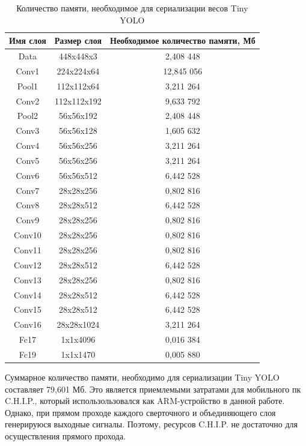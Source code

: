 \documentclass[a4paper,english,russian]{G2-105}
\begin{document}
\begin{longtable}{|c|c|c|}
    \caption{Количество памяти, необходимое для сериализации весов Tiny YOLO} \label{mbtable} \\ \hline
    Имя слоя        & Размер слоя        &    Необходимое количество памяти, Мб \\ \hline \endhead
    Data           & 448x448x3 & 2,408 448 \\ \hline
    Conv1           & 224x224x64 & 12,845 056 \\ \hline
    Pool1           & 112x112x64 & 3,211 264 \\ \hline
    Conv2           & 112x112x192 & 9,633 792 \\ \hline
    Pool2           & 56x56x192 & 2,408 448 \\ \hline
    Conv3           & 56x56x128 & 1,605 632 \\ \hline
    Conv4           & 56x56x256 & 3,211 264 \\ \hline
    Conv5           & 56x56x256 & 3,211 264 \\ \hline
    Conv6           & 56x56x512 & 6,442 528 \\ \hline
    Conv7           & 28x28x256 & 0,802 816 \\ \hline
    Conv8           & 28x28x512 & 6,442 528 \\ \hline
    Conv9           & 28x28x256 & 0,802 816 \\ \hline
    Conv10           & 28x28x256 & 0,802 816 \\ \hline
    Conv11           & 28x28x256 & 0,802 816 \\ \hline
    Conv12           & 28x28x512 & 6,442 528 \\ \hline
    Conv13           & 28x28x256 & 0,802 816 \\ \hline
    Conv14           & 28x28x512 & 6,442 528 \\ \hline
    Conv15           & 28x28x512 & 6,442 528 \\ \hline
    Conv16           & 28x28x1024 & 3,211 264 \\ \hline
    Fc17           & 1x1x4096 & 0,016 384 \\ \hline
    Fc19           & 1x1x1470 & 0,005 880 \\
\end{longtable}
\par Суммарное количество памяти, необходимо для сериализации Tiny YOLO составляет 79,601 Мб. Это является приемлемыми затратами для мобильного пк C.H.I.P., который использользовался как ARM-устройство в данной работе. Однако, при прямом проходе каждого сверточного и объединяющего слоя генерируюся выходные сигналы. Поэтому, ресурсов C.H.I.P. не достаточно для осуществления прямого прохода. 
\end{document}
